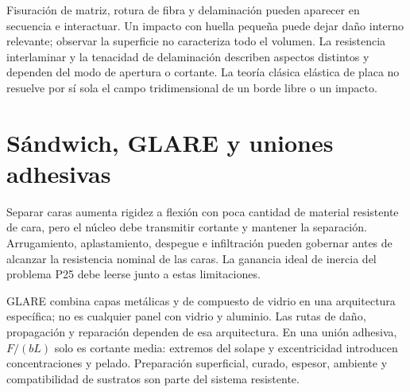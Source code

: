 Fisuración de matriz, rotura de fibra y delaminación pueden aparecer en secuencia e interactuar. Un impacto con huella pequeña puede dejar daño interno relevante; observar la superficie no caracteriza todo el volumen. La resistencia interlaminar y la tenacidad de delaminación describen aspectos distintos y dependen del modo de apertura o cortante. La teoría clásica elástica de placa no resuelve por sí sola el campo tridimensional de un borde libre o un impacto.
\Needspace{.48\textheight}
\section{Sándwich, GLARE y uniones adhesivas}
Separar caras aumenta rigidez a flexión con poca cantidad de material resistente de cara, pero el núcleo debe transmitir cortante y mantener la separación. Arrugamiento, aplastamiento, despegue e infiltración pueden gobernar antes de alcanzar la resistencia nominal de las caras. La ganancia ideal de inercia del problema P25 debe leerse junto a estas limitaciones.

GLARE combina capas metálicas y de compuesto de vidrio en una arquitectura específica; no es cualquier panel con vidrio y aluminio. Las rutas de daño, propagación y reparación dependen de esa arquitectura. En una unión adhesiva, $F/(bL)$ solo es cortante media: extremos del solape y excentricidad introducen concentraciones y pelado. Preparación superficial, curado, espesor, ambiente y compatibilidad de sustratos son parte del sistema resistente.
